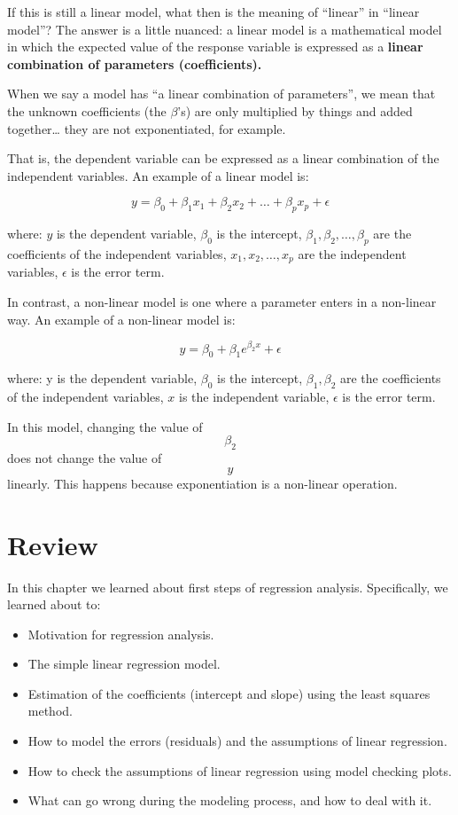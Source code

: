 \documentclass[
  letterpaper,
  8pt,
  a4paper]{book}
\providecommand{\tightlist}{%
  \setlength{\itemsep}{0pt}\setlength{\parskip}{0pt}}
\begin{document}
If this is still a linear model, what then is the meaning of ``linear''
in ``linear model''? The answer is a little nuanced: a linear model is a
mathematical model in which the expected value of the response variable
is expressed as a \textbf{linear combination of parameters
(coefficients).}

When we say a model has ``a linear combination of parameters'', we mean
that the unknown coefficients (the \(\beta\)'s) are only multiplied by
things and added together\ldots{} they are not exponentiated, for
example.

That is, the dependent variable can be expressed as a linear combination
of the independent variables. An example of a linear model is:

\[y = \beta_0 + \beta_1 x_1 + \beta_2 x_2 + \ldots + \beta_p x_p + \epsilon\]

where: \(y\) is the dependent variable, \(\beta_0\) is the intercept,
\(\beta_1, \beta_2, \ldots, \beta_p\) are the coefficients of the
independent variables, \(x_1, x_2, \ldots, x_p\) are the independent
variables, \(\epsilon\) is the error term.

In contrast, a non-linear model is one where a parameter enters in a
non-linear way. An example of a non-linear model is:

\[y = \beta_0 + \beta_1 e^{\beta_2 x} + \epsilon\]

where: y is the dependent variable, \(\beta_0\) is the intercept,
\(\beta_1, \beta_2\) are the coefficients of the independent variables,
\(x\) is the independent variable, \(\epsilon\) is the error term.

In this model, changing the value of \[\beta_2\] does not change the
value of \[y\] linearly. This happens because exponentiation is a
non-linear operation.

\section*{Review}\label{review-1}


In this chapter we learned about first steps of regression analysis.
Specifically, we learned about to:

\begin{itemize}
\tightlist
\item
  Motivation for regression analysis.
\item
  The simple linear regression model.
\item
  Estimation of the coefficients (intercept and slope) using the least
  squares method.
\item
  How to model the errors (residuals) and the assumptions of linear
  regression.
\item
  How to check the assumptions of linear regression using model checking
  plots.
\item
  What can go wrong during the modeling process, and how to deal with
  it.
\end{itemize}
\end{document}
